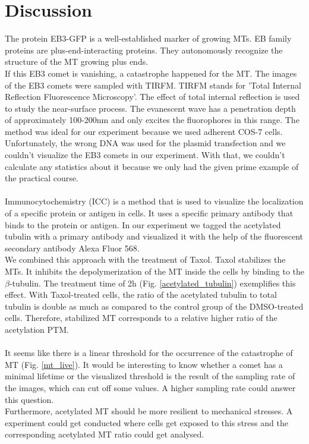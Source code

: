 \newpage
\section{Discussion}
The protein EB3-GFP is a well-established marker of growing MTs. EB family proteins are plus-end-interacting proteins. They autonomously recognize the structure of the MT growing plus ends. \\
If this EB3 comet is vanishing, a catastrophe happened for the MT.
The images of the EB3 comets were sampled with TIRFM. TIRFM stands for 'Total Internal Reflection Fluorescence Microscopy'.
The effect of total internal reflection is used to study the near-surface process. The evanescent wave has a penetration depth of approximately 100-200nm and only excites the fluorophores in this range. The method was ideal for our experiment because we used adherent COS-7 cells. \\ 
Unfortunately, the wrong DNA was used for the plasmid transfection and we couldn't visualize the EB3 comets in our experiment. With that, we couldn't calculate any statistics about it because we only had the given prime example of the practical course. 
\\\\
Immunocytochemistry (ICC) is a method that is used to visualize the localization of a specific protein or antigen in cells. It uses a specific primary antibody that binds to the protein or antigen. In our experiment we tagged the acetylated tubulin with a primary antibody and visualized it with the help of the fluorescent secondary antibody Alexa Fluor 568.\\
We combined this approach with the treatment of Taxol.
Taxol stabilizes the MTs. It inhibits the depolymerization of the MT inside the cells by binding to the $\beta$-tubulin. \cite{sackmann2010lehrbuch} The treatment time of 2h (Fig. \ref{acetylated_tubulin}) exemplifies this effect. With Taxol-treated cells, the ratio of the acetylated tubulin to total tubulin is double as much as compared to the control group of the DMSO-treated cells. Therefore, stabilized MT corresponds to a relative higher ratio of the acetylation PTM.
\\\\
It seems like there is a linear threshold for the occurrence of the catastrophe of MT (Fig. \ref{mt_live}). It would be interesting to know whether a comet has a minimal lifetime or the visualized threshold is the result of the sampling rate of the images, which can cut off some values. A higher sampling rate could answer this question.\\
Furthermore, acetylated MT should be more resilient to mechanical stresses. A experiment could get conducted where cells get exposed to this stress and the corresponding acetylated MT ratio could get analysed. 


\newpage